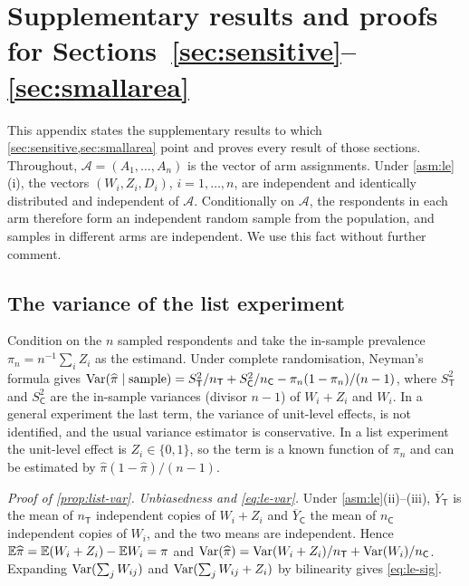 \section{Supplementary results and proofs for \texorpdfstring{Sections~\ref{sec:sensitive}--\ref{sec:smallarea}}{Sections 5}}\label{app:proofs-design}

\providecommand{\armT}{\mathsf{T}}
\providecommand{\armC}{\mathsf{C}}
\providecommand{\armD}{\mathsf{D}}
\providecommand{\armL}{\mathsf{L}}
\providecommand{\SDB}{\mathrm{SDB}}
\providecommand{\ECV}{\mathrm{ECV}}

This appendix states the supplementary results to which \cref{sec:sensitive,sec:smallarea} point and proves every result of those sections. Throughout, $\mathcal A=(A_1,\dots,A_n)$ is the vector of arm assignments. Under \cref{asm:le}(i), the vectors $(W_i,Z_i,D_i)$, $i=1,\dots,n$, are independent and identically distributed and independent of $\mathcal A$. Conditionally on $\mathcal A$, the respondents in each arm therefore form an independent random sample from the population, and samples in different arms are independent. We use this fact without further comment.

\subsection{The variance of the list experiment}\label{app:pd-listvar}

\begin{remark}\label{rem:le-neyman}
Condition on the $n$ sampled respondents and take the in-sample prevalence $\pi_n=n^{-1}\sum_iZ_i$ as the estimand. Under complete randomisation, Neyman's formula \citep[ch.~6]{imbens2015} gives
$\Var(\widehat\pi\mid\text{sample})=S_{\armT}^2/n_{\armT}+S_{\armC}^2/n_{\armC}-\pi_n(1-\pi_n)/(n-1)$,
where $S_{\armT}^2$ and $S_{\armC}^2$ are the in-sample variances (divisor $n-1$) of $W_i+Z_i$ and $W_i$. In a general experiment the last term, the variance of unit-level effects, is not identified, and the usual variance estimator is conservative. In a list experiment the unit-level effect is $Z_i\in\{0,1\}$, so the term is a known function of $\pi_n$ and can be estimated by $\widehat\pi(1-\widehat\pi)/(n-1)$.
\end{remark}

\emph{Proof of \cref{prop:list-var}.} \emph{Unbiasedness and \eqref{eq:le-var}.} Under \cref{asm:le}(ii)--(iii), $\overline Y_{\armT}$ is the mean of $n_{\armT}$ independent copies of $W_i+Z_i$ and $\overline Y_{\armC}$ the mean of $n_{\armC}$ independent copies of $W_i$, and the two means are independent. Hence $\mathbb{E}\widehat\pi=\mathbb{E}(W_i+Z_i)-\mathbb{E} W_i=\pi$ and $\Var(\widehat\pi)=\Var(W_i+Z_i)/n_{\armT}+\Var(W_i)/n_{\armC}$. Expanding $\operatorname{Var}(\sum_jW_{ij})$ and $\operatorname{Var}(\sum_jW_{ij}+Z_i)$ by bilinearity gives \eqref{eq:le-sig}.

